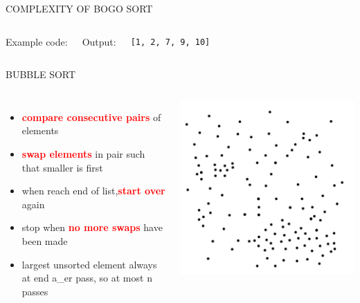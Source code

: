 \documentclass[aspectratio=169]{beamer}
\begin{document}
\begin{frame}[fragile]{COMPLEXITY OF BOGO SORT}
\begin{columns}
Example code:

Output:
\begin{block}{}
\begin{verbatim}
[1, 2, 7, 9, 10]
\end{verbatim}
\end{block}
\end{columns}

\end{frame}

\begin{frame}{BUBBLE SORT}
\begin{columns}
\begin{itemize}
\item \textcolor{red}{\textbf{compare consecutive pairs}} of elements
\item \textcolor{red}{\textbf{swap elements}} in pair such that smaller is first
\item when reach end of list,\textcolor{red}{\textbf{start over}} again
\item stop when \textcolor{red}{\textbf{no more swaps}} have been made
\item largest unsorted element always at end a\_er pass, so at most n passes
\end{itemize}
\includegraphics[scale=1]{graphics/bubble_sort.png}
\end{columns}
\end{frame}
\end{document}
